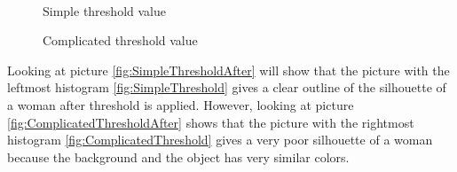 \begin{figure}[htbp]
\begin{minipage}[b]{0.45\textwidth}
\end{minipage} \\ %
\begin{minipage}[t]{0.45\textwidth}
\caption{Simple threshold value} %
\label{fig:SimpleThreshold}
\end{minipage} \hfill
\begin{minipage}[t]{0.45\textwidth}
\caption{Complicated threshold value} %
\label{fig:ComplicatedThreshold}
\end{minipage}
\end{figure}

Looking at picture \eqref{fig:SimpleThresholdAfter} will show that the picture with the leftmost histogram \eqref{fig:SimpleThreshold} gives a clear outline of the silhouette of a woman after threshold is applied. However, looking at picture \eqref{fig:ComplicatedThresholdAfter} shows that the picture with the rightmost histogram \eqref{fig:ComplicatedThreshold} gives a very poor silhouette of a woman because the background and the object has very similar colors. 

